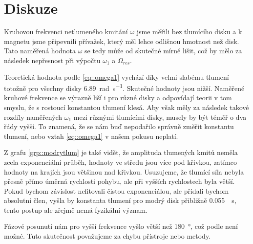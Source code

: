 \section*{Diskuze}
Kruhovou frekvenci netlumeného kmitání $\omega$ jsme měřili bez tlumícího disku a k magnetu jsme připevnili přívažek, který měl lehce odlišnou hmotnost než disk.
Tato naměřená hodnota $\omega$ se tedy může od skutečné mírně lišit, což by mělo za následek nepřesnost při výpočtu $\omega_1$ a $\Omega_{res}$.

Teoretická hodnota podle \eqref{eq::omega1} vychází díky velmi slabému tlumení totožně pro všechny disky \SI{6.89}{\radian\per\s}.
Skutečné hodnoty jsou nižší.
Naměřené kruhové frekvence se výrazně liší i pro různé disky a odpovídají teorii v tom smyslu, že s rostoucí konstantou tlumení klesá.
Aby však měly za následek takové rozdíly naměřených $\omega_1$ mezi různými tlumícími disky, musely by být téměř o dva řády vyšší.
To znamená, že se nám buď nepodařilo správně změřit konstantu tlumení, nebo vztah \eqref{eq::omega1} v našem pokusu neplatí.

Z grafu \ref{grp::modrytlum} je také vidět, že amplituda tlumených kmitů neměla zcela exponenciální průběh, hodnoty ve středu jsou více pod křivkou, zatímco hodnoty na krajích jsou většinou nad křivkou.
Usuzujeme, že tlumící síla nebyla přesně přímo úměrná rychlosti pohybu, ale při vyšších rychlostech byla větší.
Pokud bychom závislost nefitovali čistou exponenciálou, ale přidali bychom absolutní člen, vyšla by konstanta tlumení pro modrý disk přibližně \SI{0.055}{\per\s}, tento postup ale zřejmě nemá fyzikální význam.

Fázové posunutí nám pro vyšší frekvence vyšlo větší než \SI{180}{\degree}, což podle \cite{skripta} není možné.
Tuto skutečnost považujeme za chybu přístroje nebo metody.